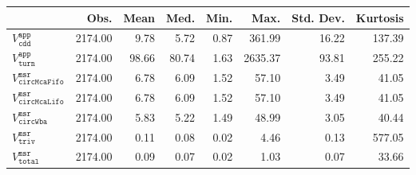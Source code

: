 \begin{tabular}{lrrrrrrr}
  \hline
 & Obs. & Mean & Med. & Min. & Max. & Std. Dev. & Kurtosis \\ 
  \hline
$V^{\mathtt{app}}_{\mathtt{cdd}}$ & 2174.00 & 9.78 & 5.72 & 0.87 & 361.99 & 16.22 & 137.39 \\ 
  $V^{\mathtt{app}}_{\mathtt{turn}}$ & 2174.00 & 98.66 & 80.74 & 1.63 & 2635.37 & 93.81 & 255.22 \\ 
  $V^{\mathtt{msr}}_{\mathtt{circMcaFifo}}$ & 2174.00 & 6.78 & 6.09 & 1.52 & 57.10 & 3.49 & 41.05 \\ 
  $V^{\mathtt{msr}}_{\mathtt{circMcaLifo}}$ & 2174.00 & 6.78 & 6.09 & 1.52 & 57.10 & 3.49 & 41.05 \\ 
  $V^{\mathtt{msr}}_{\mathtt{circWba}}$ & 2174.00 & 5.83 & 5.22 & 1.49 & 48.99 & 3.05 & 40.44 \\ 
  $V^{\mathtt{msr}}_{\mathtt{triv}}$ & 2174.00 & 0.11 & 0.08 & 0.02 & 4.46 & 0.13 & 577.05 \\ 
  $V^{\mathtt{msr}}_{\mathtt{total}}$ & 2174.00 & 0.09 & 0.07 & 0.02 & 1.03 & 0.07 & 33.66 \\ 
   \hline
\end{tabular}
